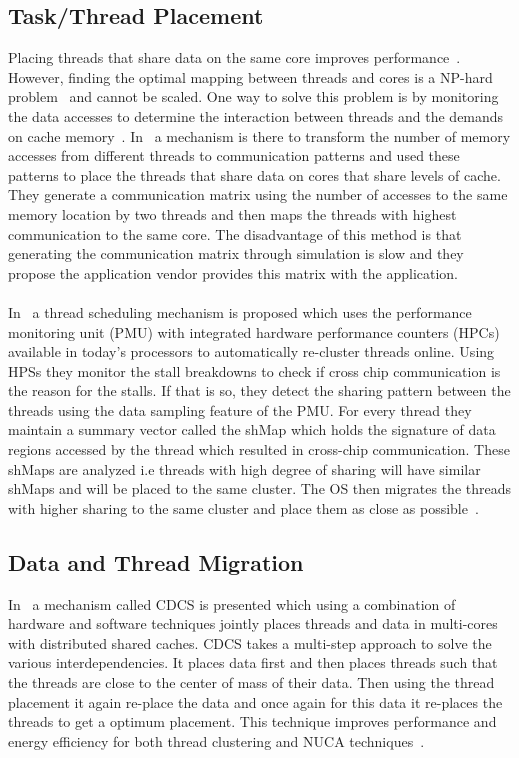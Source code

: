 \documentclass{listhesis}
\begin{document}
\subsection{Task/Thread Placement}
Placing threads that share data on the same core improves performance~\cite{threadPlacement1}. However, finding the optimal mapping between threads and cores is a NP-hard problem~\cite{threadPlacement2} and cannot be scaled. One way to solve this problem is by monitoring the data accesses to determine the interaction between threads and the demands on cache memory~\cite{threadPlacement3}. In~\cite{threadPlacement3} a mechanism is there to transform the number of memory accesses from different threads to communication patterns and used these patterns to place the threads that share data on cores that share levels of cache.  They generate a communication matrix using the number of accesses to the same memory location by two threads and then maps the threads with highest communication to the same core. The disadvantage of this method is that generating the communication matrix through simulation is slow and they propose the application vendor provides this matrix with the application.\\
\\
In~\cite{threadPlacement4} a thread scheduling mechanism is proposed which uses the performance monitoring unit (PMU) with integrated hardware performance counters (HPCs) available in today's processors to automatically re-cluster threads online. Using HPSs they monitor the stall breakdowns to check if cross chip communication is the reason for the stalls. If that is so, they detect the sharing pattern between the threads using the data sampling feature of the PMU.  For every thread they maintain a summary vector called the shMap  which holds the signature of data regions accessed by the thread which resulted in cross-chip communication. These shMaps are analyzed i.e threads with high degree of sharing will have similar shMaps and will be placed to the same cluster. The OS then migrates the threads with higher sharing to the same cluster and place them as close as possible~\cite{threadPlacement4}.\\
\subsection{Data and Thread Migration}
In~\cite{datathreadPlacement} a mechanism called CDCS is presented which using a combination of hardware and software techniques jointly places threads and data in multi-cores with distributed shared caches. CDCS takes a multi-step approach to solve the various interdependencies. It places data first and then places threads such that the threads are close to the center of mass of their data. Then using the thread placement it again re-place the data and once again for this data it re-places the threads to get a optimum placement. This technique improves performance and energy efficiency for both thread clustering and NUCA techniques~\cite{datathreadPlacement}.\\
\end{document}

